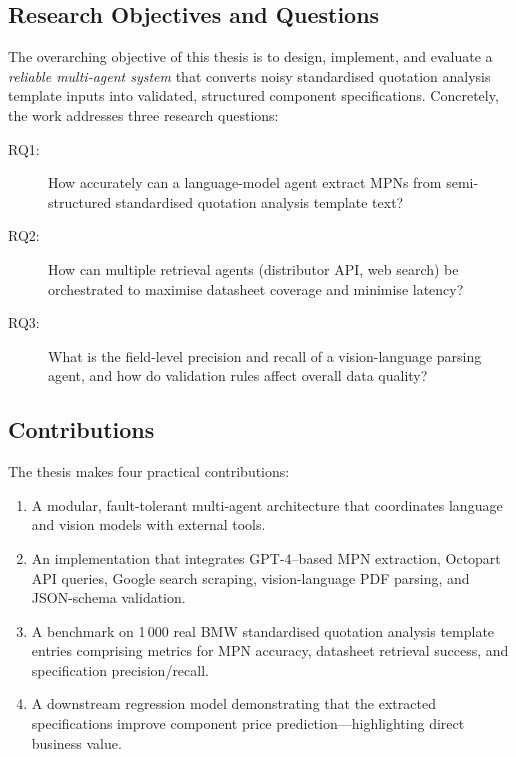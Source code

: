 \documentclass[11pt]{article}
\begin{document}
\subsection{Research Objectives and Questions}
The overarching objective of this thesis is to design, implement, and evaluate a \emph{reliable multi-agent system} that converts noisy standardised quotation analysis template inputs into validated, structured component specifications.  
Concretely, the work addresses three research questions:

\begin{description}
  \item[RQ1:] How accurately can a language-model agent extract MPNs from semi-structured standardised quotation analysis template text?
  \item[RQ2:] How can multiple retrieval agents (distributor API, web search) be orchestrated to maximise datasheet coverage and minimise latency?
  \item[RQ3:] What is the field-level precision and recall of a vision-language parsing agent, and how do validation rules affect overall data quality?
\end{description}

\subsection{Contributions}
The thesis makes four practical contributions:
\begin{enumerate}
  \item A modular, fault-tolerant multi-agent architecture that coordinates language and vision models with external tools.
  \item An implementation that integrates GPT-4–based MPN extraction, Octopart API queries, Google search scraping, vision-language PDF parsing, and JSON-schema validation.
  \item A benchmark on 1\,000 real BMW standardised quotation analysis template entries comprising metrics for MPN accuracy, datasheet retrieval success, and specification precision/recall.
  \item A downstream regression model demonstrating that the extracted specifications improve component price prediction—highlighting direct business value.
\end{enumerate}
\end{document}
